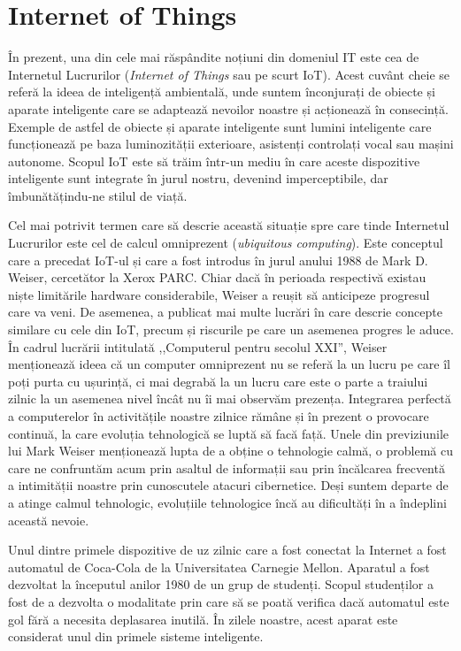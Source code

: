 \section{Internet of Things}
\label{sec:embed:iot}

În prezent, una din cele mai răspândite noțiuni din domeniul IT este cea de
Internetul Lucrurilor (\textit{Internet of Things} sau pe scurt IoT). Acest cuvânt cheie
se referă la ideea de inteligență ambientală, unde suntem înconjurați de obiecte
și aparate inteligente care se adaptează nevoilor noastre și acționează în
consecință. Exemple de astfel de obiecte și aparate inteligente sunt lumini inteligente care funcționează pe baza luminozității
exterioare, asistenți controlați vocal sau mașini autonome. Scopul IoT
este să trăim într-un mediu în care aceste dispozitive inteligente sunt
integrate în jurul nostru, devenind imperceptibile, dar îmbunătățindu-ne stilul
de viață.

Cel mai potrivit termen care să descrie această situație spre care tinde
Internetul Lucrurilor este cel de calcul omniprezent (\textit{ubiquitous computing}).
Este conceptul care a precedat IoT-ul și care a fost introdus în jurul anului
1988 de Mark D. Weiser, cercetător la Xerox PARC. Chiar dacă în perioada
respectivă existau niște limitările hardware considerabile, Weiser a reușit să
anticipeze progresul care va veni. De asemenea, a publicat mai multe lucrări
în care descrie concepte similare cu cele din IoT, precum și riscurile pe
care un asemenea progres le aduce. În cadrul lucrării intitulată ,,Computerul
pentru secolul XXI'', Weiser menționează ideea că un computer omniprezent nu se
referă la un lucru pe care îl poți purta cu ușurință, ci mai degrabă la un lucru
care este o parte a traiului zilnic la un asemenea nivel încât nu îi mai
observăm prezența. Integrarea perfectă a computerelor în activitățile noastre
zilnice rămâne și în prezent o provocare continuă, la care evoluția tehnologică
se luptă să facă față. Unele din previziunile lui Mark Weiser menționează lupta
de a obține o tehnologie calmă, o problemă cu care ne confruntăm acum prin
asaltul de informații sau prin încălcarea frecventă a intimității noastre prin
cunoscutele atacuri cibernetice. Deși suntem departe de a atinge calmul
tehnologic, evoluțiile tehnologice încă au dificultăți în a îndeplini această nevoie.

Unul dintre primele dispozitive de uz zilnic care a fost conectat la Internet a
fost automatul de Coca-Cola de la Universitatea Carnegie Mellon. Aparatul a fost
dezvoltat la începutul anilor 1980 de un grup de studenți. Scopul studenților a
fost de a dezvolta o modalitate prin care să se poată verifica dacă automatul
este gol fără a necesita deplasarea inutilă. În zilele noastre, acest aparat
este considerat unul din primele sisteme inteligente.

